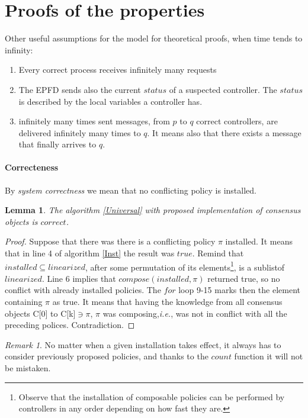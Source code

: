 \documentclass{article}
\newtheorem{lemma}{Lemma}
\theoremstyle{remark}
\newtheorem*{remark}{Remark}
\begin{document}
\section{Proofs of the properties}
Other useful assumptions for the model for theoretical proofs, when time tends to infinity:
\begin{enumerate}
\item Every correct process receives infinitely many requests
\item The EPFD sends also the current $status$ of a suspected controller. The $status$ is described by the local variables a controller has.
\item infinitely many times sent messages, from $p$ to $q$ correct controllers, are delivered infinitely many times to $q$. It means also that there exists a message that finally arrives to $q$.
\end{enumerate}

\paragraph{Correcteness} 
By \emph{system correctness} we mean that no conflicting policy is installed.
\begin{lemma}\label{Correctness}
The algorithm \ref{Universal} with proposed implementation of consensus objects is $correct$. 
\end{lemma}
\begin{proof}
Suppose that there was there is a conflicting policy $\pi$ installed. It means that in line 4 of algorithm \ref{Inst} the result was $true$. Remind that $installed\subseteq linearized$, after some permutation of its elements\footnote{Observe that the installation of composable policies can be performed by controllers in any order depending on how fast they are.}, is a sublist\footnotemark of $linearized$. 
 Line 6 implies that $compose(installed,\pi)$ returned true, so no conflict with already installed policies. The $for$ loop 9-15 marks then the element containing $\pi$ as true. It means that having the knowledge from all consensus objects C[0] to C[k]$\ni\pi$, $\pi$ was composing,\emph{i.e.}, was not in conflict with all the preceding polices. Contradiction.
\end{proof}
\begin{remark}
No matter when a given installation takes effect, it always has to consider previously proposed policies, and thanks to the $count$ function it will not be mistaken.
\end{remark}
\end{document}
